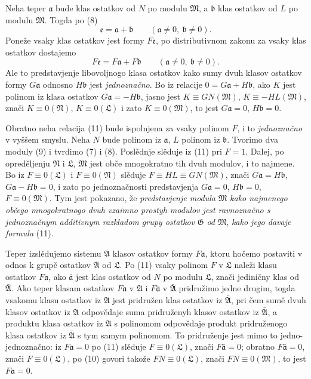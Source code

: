 \documentclass[11pt]{article}
\providecommand{\mM}{\mathfrak M}
\providecommand{\mN}{\mathfrak N}
\providecommand{\mL}{\mathfrak L}
\providecommand{\mG}{\mathfrak G}
\providecommand{\mA}{\mathfrak A}
\providecommand{\mbarA}{\bar{\mathfrak A}}
\providecommand{\ma}{\mathfrak a}
\providecommand{\mb}{\mathfrak b}
\providecommand{\me}{\mathfrak e}
\providecommand{\bara}{\bar{\mathfrak a}}
\begin{document}
Neha teper \(\ma\) bude klas ostatkov od \(N\) po modulu \(\mM\), a \(\mb\) klas ostatkov od \(L\) po modulu \(\mM\). Togda po (8)
\[
 \me=\ma+\mb\qquad(\ma\ne0,\ \mb\ne0).
\]
Poneže vsaky klas ostatkov jest formy \(F\me\), po distributivnom zakonu za vsaky klas ostatkov dostajemo
\begin{equation}
 F\me=F\ma+F\mb\qquad(\ma\ne0,\ \mb\ne0).
\tag{11}
\end{equation}
Ale to predstavjenje libovoljnogo klasa ostatkov kako sumy dvuh klasov ostatkov formy \(G\ma\) odnosno \(H\mb\) jest \textit{jednoznačno}. Bo iz relacije \(0=G\ma+H\mb\), ako \(K\) jest polinom iz klasa ostatkov \(G\ma=-H\mb\), jasno jest \(K\equiv GN(\mM)\), \(K\equiv-HL(\mM)\), znači \(K\equiv0(\mN)\), \(K\equiv0(\mL)\) i zato \(K\equiv0(\mM)\), to jest \(G\ma=0\), \(H\mb=0\).

Obratno neha relacija (11) bude ispolnjena za vsaky polinom \(F\), i to \textit{jednoznačno} v vyššem smyslu. Neha \(N\) bude polinom iz \(\ma\), \(L\) polinom iz \(\mb\). Tvorimo dva moduly (9) i tvrdimo (7) i (8). Poslědnje slěduje iz (11) pri \(F=1\). Dalej, po opreděljenju \(\mN\) i \(\mL\), \(\mM\) jest obče mnogokratno tih dvuh modulov, i to najmene. Bo iz \(F\equiv0(\mL)\) i \(F\equiv0(\mN)\) slěduje \(F\equiv HL\equiv GN(\mM)\), znači \(G\ma=H\mb\), \(G\ma-H\mb=0\), i zato po jednoznačnosti predstavjenja \(G\ma=0\), \(H\mb=0\), \(F\equiv0(\mM)\). Tym jest pokazano, že \textit{predstavjenje modula} \(\mM\) \textit{kako najmenego občego mnogokratnogo dvuh vzaimno prostyh modulov jest ravnoznačno s jednoznačnym additivnym razkladom grupy ostatkov} \(\mG\) \textit{od} \(\mM\), \textit{kako jego davaje formula} (11).

Teper izslědujemo sistemu \(\mA\) klasov ostatkov formy \(F\ma\), ktoru hočemo postaviti v odnos k grupě ostatkov \(\mbarA\) od \(\mL\). Po (11) vsaky polinom \(F\) v \(\mL\) naleži klasu ostatkov \(F\ma\), ako \(\bara\) jest klas ostatkov od \(N\) po modulu \(\mL\), znači jediničny klas od \(\mbarA\). Ako teper klasam ostatkov \(F\ma\) v \(\mA\) i \(F\bara\) v \(\mbarA\) pridružimo jedne drugim, togda vsakomu klasu ostatkov iz \(\mA\) jest pridružen klas ostatkov iz \(\mbarA\), pri čem sumě dvuh klasov ostatkov iz \(\mA\) odpovědaje suma pridruženyh klasov ostatkov iz \(\mbarA\), a produktu klasa ostatkov iz \(\mA\) s polinomom odpovědaje produkt pridruženogo klasa ostatkov iz \(\mbarA\) s tym samym polinomom. To pridruženje jest mimo to jedno-jednoznačno: iz \(F\ma=0\) po (11) slěduje \(F\equiv0(\mL)\), znači \(F\bara=0\); obratno \(F\bara=0\), znači \(F\equiv0(\mL)\), po (10) govori takože \(FN\equiv0(\mL)\), znači \(FN\equiv0(\mM)\), to jest \(F\ma=0\).
\end{document}
